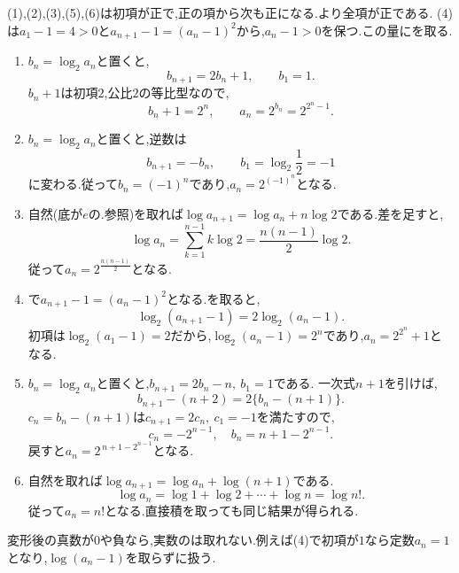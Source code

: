   \noindent{}\par\nobreak
  
  (1),(2),(3),(5),(6)は初項が正で,正の項から次も正になる.より全項が正である.
  (4)は$a_1-1=4>0$と$a_{n+1}-1=(a_n-1)^2$から,$a_n-1>0$を保つ.この量にを取る.
  \begin{enumerate}[label=(\arabic*),parsep=3pt,format=\bookitemlink{example-logarithmic-1}{solution}{problem}]
    \item $b_n=\log_2a_n$と置くと,
      \[
        b_{n+1}=2b_n+1,\qquad b_1=1.
      \]
      $b_n+1$は初項$2$,公比$2$の等比型なので,
      \[
        b_n+1=2^n,\qquad a_n=2^{b_n}=2^{2^n-1}.
      \]
    \item $b_n=\log_2a_n$と置くと,逆数は
      \[
        b_{n+1}=-b_n,\qquad b_1=\log_2\frac12=-1
      \]
      に変わる.従って$b_n=(-1)^n$であり,$a_n=2^{(-1)^n}$となる.
    \item 自然(底が$e$の.参照)を取れば$\log a_{n+1}=\log a_n+n\log2$である.差を足すと,
      \[
        \log a_n=\sum_{k=1}^{n-1}k\log2=\frac{n(n-1)}2\log2.
      \]
      従って$a_n=2^{\frac{n(n-1)}{2}}$となる.
    \item {}で$a_{n+1}-1=(a_n-1)^2$となる.を取ると,
      \[
        \log_2(a_{n+1}-1)=2\log_2(a_n-1).
      \]
      初項は$\log_2(a_1-1)=2$だから,$\log_2(a_n-1)=2^n$であり,$a_n=2^{2^n}+1$となる.
    \item $b_n=\log_2a_n$と置くと,$b_{n+1}=2b_n-n,\ b_1=1$である.
      一次式$n+1$を引けば,
      \[
        b_{n+1}-(n+2)=2\{b_n-(n+1)\}.
      \]
      $c_n=b_n-(n+1)$は$c_{n+1}=2c_n,\ c_1=-1$を満たすので,
      \[
        c_n=-2^{n-1},\quad b_n=n+1-2^{n-1}.
      \]
      戻すと$a_n=2^{\,n+1-2^{n-1}}$となる.
    \item 自然を取れば$\log a_{n+1}=\log a_n+\log(n+1)$である.
      \[
        \log a_n=\log1+\log2+\cdots+\log n=\log n!.
      \]
      従って$a_n=n!$となる.直接積を取っても同じ結果が得られる.
  \end{enumerate}
  
  変形後の真数が$0$や負なら,実数のは取れない.例えば(4)で初項が$1$なら定数$a_n=1$となり,$\log(a_n-1)$を取らずに扱う.
  
